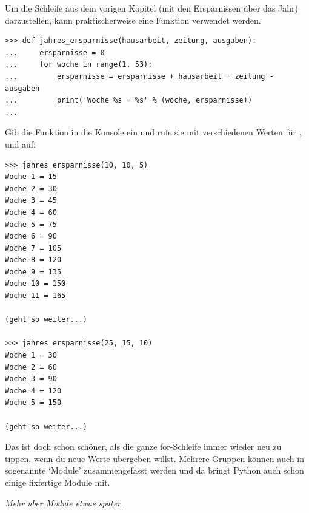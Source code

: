 Um die Schleife aus dem vorigen Kapitel (mit den Ersparnissen über das Jahr) darzustellen, kann praktischerweise eine Funktion verwendet werden.

\begin{Verbatim}[frame=single]
>>> def jahres_ersparnisse(hausarbeit, zeitung, ausgaben):
...     ersparnisse = 0
...     for woche in range(1, 53):
...         ersparnisse = ersparnisse + hausarbeit + zeitung - ausgaben
...         print('Woche %s = %s' % (woche, ersparnisse))
...
\end{Verbatim}

Gib die Funktion in die Konsole ein und rufe sie mit verschiedenen Werten für ,  und  auf:




\begin{Verbatim}[frame=single, label=Ausgabe]
>>> jahres_ersparnisse(10, 10, 5)
Woche 1 = 15
Woche 2 = 30
Woche 3 = 45
Woche 4 = 60
Woche 5 = 75
Woche 6 = 90
Woche 7 = 105
Woche 8 = 120
Woche 9 = 135
Woche 10 = 150
Woche 11 = 165

(geht so weiter...)

>>> jahres_ersparnisse(25, 15, 10)
Woche 1 = 30
Woche 2 = 60
Woche 3 = 90
Woche 4 = 120
Woche 5 = 150

(geht so weiter...)
\end{Verbatim}

Das ist doch schon schöner, als die ganze for-Schleife immer wieder neu zu tippen, wenn du neue Werte übergeben willst. Mehrere Gruppen können auch in sogenannte `Module' zusammengefasst werden und da bringt Python auch schon einige fixfertige Module mit.
\par
\noindent
\emph{Mehr über Module etwas später.}

